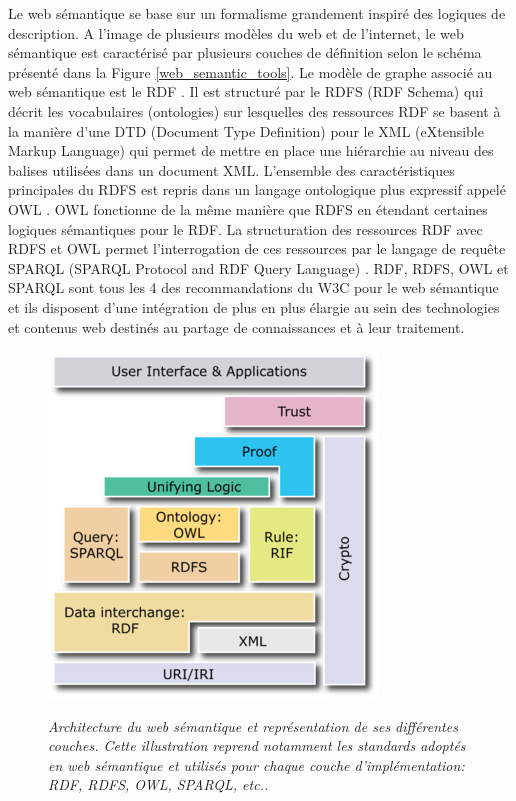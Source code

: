 Le web sémantique se base sur un formalisme grandement inspiré des logiques de description. A l'image de plusieurs modèles du web et de l'internet, le web sémantique est caractérisé par plusieurs couches de définition selon le schéma présenté dans la Figure \ref{web_semantic_tools}. Le modèle de graphe associé au web sémantique est le RDF \cite{klyne2006resource}. Il est structuré par le RDFS (RDF Schema) \cite{brickley2004rdf} qui décrit les vocabulaires (ontologies) sur lesquelles des ressources RDF se basent à la manière d'une DTD (Document Type Definition) pour le XML (eXtensible Markup Language) qui permet de mettre en place une hiérarchie au niveau des balises utilisées dans un document XML. 
L'ensemble des caractéristiques principales du RDFS est repris dans un langage ontologique plus expressif appelé OWL \cite{mcguinness2004owl}. OWL fonctionne de la même manière que RDFS en étendant certaines logiques sémantiques pour le RDF. La structuration des ressources RDF avec RDFS et OWL permet l'interrogation de ces ressources par le langage de requête SPARQL (SPARQL Protocol and RDF Query Language) \cite{prud2008sparql}. RDF, RDFS, OWL et SPARQL sont tous les 4 des recommandations du W3C pour le web sémantique et ils disposent d'une intégration de plus en plus élargie au sein des technologies et contenus web destinés au partage de connaissances et à leur traitement.

\begin{figure}
  \centering
  {\includegraphics[width=.5\linewidth]{./figures/ch2/web_semantic_hierarchy}}
    \caption{\it Architecture du web sémantique et représentation de ses différentes couches. Cette illustration reprend notamment les standards adoptés en web sémantique et utilisés pour chaque couche d'implémentation: RDF, RDFS, OWL, SPARQL, etc..}
  \label{Fig:web_semantic_hierarchy}
  \hspace{0.3cm}
\end{figure}

